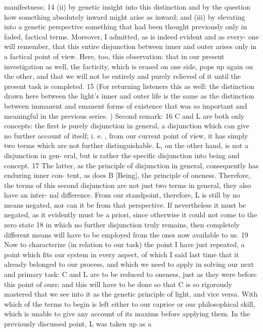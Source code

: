 manifestness; 14 (ii) by genetic insight into this distinction and by the question
how something absolutely inward might arise as inward; and (iii) by elevating
into a genetic perspective something that had been thought previously only in
faded, factical terms.
 Moreover, I admitted, as is indeed evident and as every-
one will remember, that this entire disjunction between inner and outer arises
only in a factical point of view.
 Here, too, this observation: that in our
present investigation as well, the facticity, which is erased on one side, pops up
again on the other, and that we will not be entirely and purely relieved of it
until the present task is completed.
 15 (For returning listeners this as well: the
distinction drawn here between the light’s inner and outer life is the same as
the distinction between immanent and emanent forms of existence that was so
important and meaningful in the previous series.
)
Second remark: 16 C and L are both only concepts: the first is
purely disjunction in general, a disjunction which can give no further account
of itself; i.
e.
, from our current point of view, it has simply two terms which are
not further distinguishable.
 L, on the other hand, is not a disjunction in gen-
eral, but is rather the specific disjunction into being and concept.
 17 The latter,
as the principle of disjunction in general, consequently has enduring inner con-
tent, as does B [Being], the principle of oneness.
 Therefore, the terms of this
second disjunction are not just two terms in general, they also have an inter-
nal difference.
 From our standpoint, therefore, L is still by no means negated,
nor can it be from that perspective.
 If nevertheless it must be negated, as it
evidently must be a priori, since otherwise it could not come to the zero state 18
in which no further disjunction truly remains, then completely different
means will have to be employed from the ones now available to us.
 19
Now to characterize (in relation to our task) the point I have just
repeated, a point which fits our system in every aspect, of which I said last
time that it already belonged to our process, and which we need to apply in
solving our next and primary task: C and L are to be reduced to oneness, just
as they were before this point of ours; and this will have to be done so that C
is so rigorously mastered that we see into it as the genetic principle of light,
and vice versa.
 With which of the terms to begin is left either to our caprice or
our philosophical skill, which is unable to give any account of its maxims
before applying them.
 In the previously discussed point, L was taken up as a
